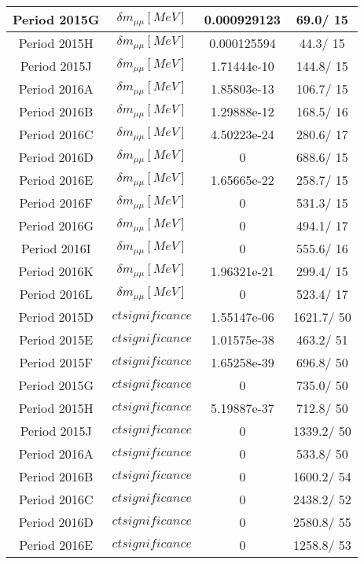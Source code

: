 \documentclass{article}
\begin{document}
\begin{longtable}{c|c|c|c}
\hline
 Period 2015G & $\delta m_{\mu\mu} [MeV]$ & 0.000929123 &  69.0/ 15\\
\hline
 Period 2015H & $\delta m_{\mu\mu} [MeV]$ & 0.000125594 &  44.3/ 15\\
\hline
 Period 2015J & $\delta m_{\mu\mu} [MeV]$ & 1.71444e-10 & 144.8/ 15\\
\hline
 Period 2016A & $\delta m_{\mu\mu} [MeV]$ & 1.85803e-13 & 106.7/ 15\\
\hline
 Period 2016B & $\delta m_{\mu\mu} [MeV]$ & 1.29888e-12 & 168.5/ 16\\
\hline
 Period 2016C & $\delta m_{\mu\mu} [MeV]$ & 4.50223e-24 & 280.6/ 17\\
\hline
 Period 2016D & $\delta m_{\mu\mu} [MeV]$ & 0 & 688.6/ 15\\
\hline
 Period 2016E & $\delta m_{\mu\mu} [MeV]$ & 1.65665e-22 & 258.7/ 15\\
\hline
 Period 2016F & $\delta m_{\mu\mu} [MeV]$ & 0 & 531.3/ 15\\
\hline
 Period 2016G & $\delta m_{\mu\mu} [MeV]$ & 0 & 494.1/ 17\\
\hline
 Period 2016I & $\delta m_{\mu\mu} [MeV]$ & 0 & 555.6/ 16\\
\hline
 Period 2016K & $\delta m_{\mu\mu} [MeV]$ & 1.96321e-21 & 299.4/ 15\\
\hline
 Period 2016L & $\delta m_{\mu\mu} [MeV]$ & 0 & 523.4/ 17\\
\hline
 Period 2015D & $ct significance$ & 1.55147e-06 & 1621.7/ 50\\
\hline
 Period 2015E & $ct significance$ & 1.01575e-38 & 463.2/ 51\\
\hline
 Period 2015F & $ct significance$ & 1.65258e-39 & 696.8/ 50\\
\hline
 Period 2015G & $ct significance$ & 0 & 735.0/ 50\\
\hline
 Period 2015H & $ct significance$ & 5.19887e-37 & 712.8/ 50\\
\hline
 Period 2015J & $ct significance$ & 0 & 1339.2/ 50\\
\hline
 Period 2016A & $ct significance$ & 0 & 533.8/ 50\\
\hline
 Period 2016B & $ct significance$ & 0 & 1600.2/ 54\\
\hline
 Period 2016C & $ct significance$ & 0 & 2438.2/ 52\\
\hline
 Period 2016D & $ct significance$ & 0 & 2580.8/ 55\\
\hline
 Period 2016E & $ct significance$ & 0 & 1258.8/ 53\\

\end{longtable}
\end{document}
